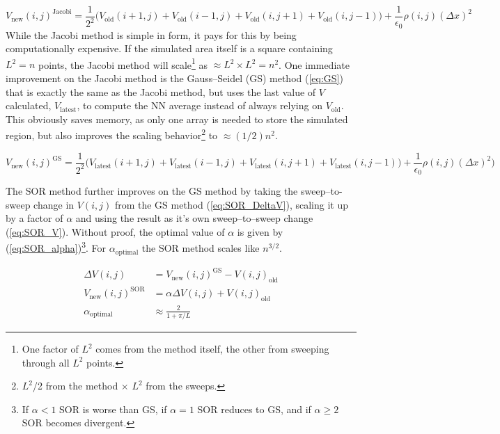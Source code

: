 \documentclass[notitlepage,aps,prd,nofootinbib]{revtex4-1}
\begin{document}
\begin{equation} \label{eq:jacobi}
V_{\mathrm{new}}\left(i,j\right)^{\mathrm{Jacobi}} = \frac{1}{2^2}\big( V_{\mathrm{old}}\left(i+1,j\right) + V_{\mathrm{old}}\left(i-1,j\right) +V_{\mathrm{old}}\left(i,j+1\right) +V_{\mathrm{old}}\left(i,j-1\right) \big) + \frac{1}{\epsilon_{0}} \rho\left(i,j\right)\left(\Delta x\right)^{2}
\end{equation}
While the Jacobi method is simple in form, it pays for this by being computationally expensive. If the simulated area itself is a square containing $L^{2} = n$ points, the Jacobi method will scale\footnote{One factor of $L^{2}$ comes from the method itself, the other from sweeping through all $L^{2}$ points.} as $\approx L^{2} \times L^{2} = n^{2}$. One immediate improvement on the Jacobi method is the Gauss--Seidel (GS) method (\ref{eq:GS}) that is exactly the same as the Jacobi method, but uses the last value of $V$ calculated, $V_{\mathrm{latest}}$, to compute the NN average instead of always relying on $V_{\mathrm{old}}$. This obviously saves memory, as only one array is needed to store the simulated region, but also improves the scaling behavior\footnote{$L^{2}$/2 from the method $\times$ $L^{2}$ from the sweeps.} to $\approx (1/2)n^{2}$.

\begin{equation} \label{eq:GS}
V_{\mathrm{new}}\left(i,j\right)^{\mathrm{GS}} = \frac{1}{2^2}\big( V_{\mathrm{latest}}\left(i+1,j\right) + V_{\mathrm{latest}}\left(i-1,j\right) +V_{\mathrm{latest}}\left(i,j+1\right) +V_{\mathrm{latest}}\left(i,j-1\right) \big) + \frac{1}{\epsilon_{0}} \rho\left(i,j\right)\left(\Delta x\right)^{2}
)
\end{equation}

The SOR method further improves on the GS method by taking the sweep--to-sweep change in $V\left(i,j\right)$ from the GS method (\ref{eq:SOR_DeltaV}), scaling it up by a factor of $\alpha$ and using the result as it's own sweep--to--sweep change (\ref{eq:SOR_V}). Without proof, the optimal value of $\alpha$ is given by (\ref{eq:SOR_alpha})\footnote{If $\alpha < 1$ SOR is worse than GS, if $\alpha = 1$ SOR reduces to GS, and if $\alpha \geq 2$ SOR becomes divergent.}. For $\alpha_{\mathrm{optimal}}$ the SOR method scales like $n^{3/2}$.

\begin{align}
\Delta V\left(i,j\right) &= V_{\mathrm{new}}\left(i,j\right)^{\mathrm{GS}} - V\left(i,j\right)_{\mathrm{old}} \label{eq:SOR_DeltaV} \\
V_{\mathrm{new}}\left(i,j\right)^{\mathrm{SOR}} &= \alpha \Delta V\left(i,j\right) + V\left(i,j\right)_{\mathrm{old}} \label{eq:SOR_V} \\
\alpha_{\mathrm{optimal}} &\approx \frac{2}{1+\pi/L} \label{eq:SOR_alpha} 
\end{align}
\end{document}
